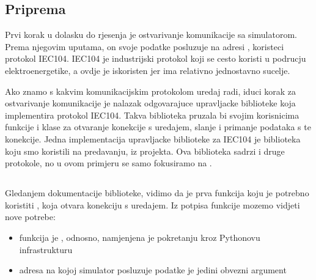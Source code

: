 \documentclass[letterpaper,10pt,croatian]{sphinxmanual}
\begin{document}
\subsection{Priprema}
\label{\detokenize{01-architecture/index:priprema}}
\sphinxAtStartPar
Prvi korak u dolasku do rjesenja je ostvarivanje komunikacije sa simulatorom.
Prema njegovim uputama, on svoje podatke posluzuje na adresi
, koristeci protokol IEC104. IEC104 je industrijski protokol
koji se cesto koristi u podrucju elektroenergetike, a ovdje je iskoristen jer
ima relativno jednostavno sucelje.

\sphinxAtStartPar
Ako znamo s kakvim komunikacijskim protokolom uredaj radi, iduci korak za
ostvarivanje komunikacije je nalazak odgovarajuce upravljacke biblioteke koja
implementira protokol IEC104. Takva biblioteka pruzala bi svojim korisnicima
funkcije i klase za otvaranje konekcije s uredajem, slanje i primanje podataka
s te konekcije. Jedna implementacija upravljacke biblioteke za IEC104 je
biblioteka koju smo koristili na predavanju,  iz  projekta. Ova biblioteka
sadrzi i druge protokole, no u ovom primjeru se samo fokusiramo na .


\subsection{}
\label{\detokenize{01-architecture/index:asyncio}}
\sphinxAtStartPar
Gledanjem dokumentacije biblioteke, vidimo da je prva funkcija koju je potrebno
koristiti ,
koja otvara konekciju s uredajem. Iz potpisa funkcije mozemo vidjeti nove
potrebe:
\begin{itemize}
\item {} 
\sphinxAtStartPar
funkcija je , odnosno, namjenjena je pokretanju kroz Pythonovu
 infrastrukturu

\item {} 
\sphinxAtStartPar
adresa na kojoj simulator posluzuje podatke je jedini obvezni argument

\end{itemize}
\end{document}
